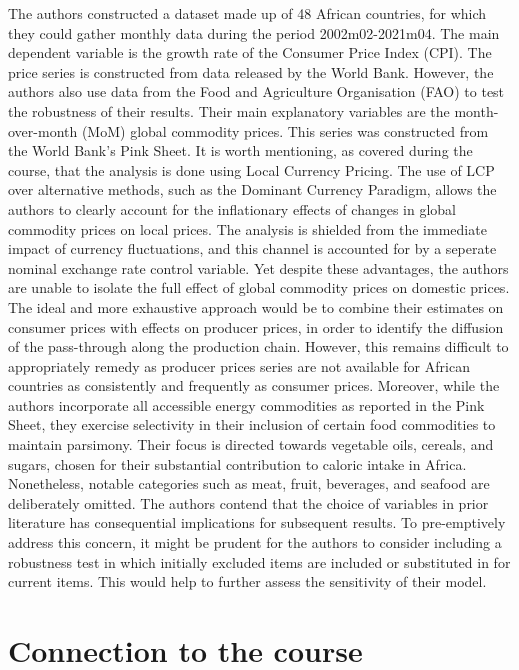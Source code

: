 \documentclass[11pt]{article}
\newcommand{\bb}{\bigbreak\noindent}
\begin{document}
\begin{spacing}{2}
		The authors constructed a dataset made up of 48 African countries, for which they could gather monthly data during the period 2002m02-2021m04. The main dependent variable is the growth rate of the Consumer Price Index (CPI). The price series is constructed from data released by the World Bank. However, the authors also use data from the Food and Agriculture Organisation (FAO) to test the robustness of their results. Their main explanatory variables are the month-over-month (MoM) global commodity prices. This series was constructed from the World Bank's Pink Sheet. 
		\bb
		It is worth mentioning, as covered during the course, that the analysis is done using Local Currency Pricing. 
		The use of LCP over alternative methods, such as the Dominant Currency Paradigm, allows the authors to clearly account for the inflationary effects of changes in global commodity prices on local prices. The analysis is shielded from the immediate impact of currency fluctuations, and this channel is accounted for by a seperate nominal exchange rate control variable. Yet despite these advantages, the authors are unable to isolate the full effect of global commodity prices on domestic prices. The ideal and more exhaustive approach would be to combine their estimates on consumer prices with effects on producer prices, in order to identify the diffusion of the pass-through along the production chain. However, this remains difficult to appropriately remedy as producer prices series are not available for African countries as consistently and frequently as consumer prices.
		\bb
		Moreover, while the authors incorporate all accessible energy commodities as reported in the Pink Sheet, they exercise selectivity in their inclusion of certain food commodities to maintain parsimony. Their focus is directed towards vegetable oils, cereals, and sugars, chosen for their substantial contribution to caloric intake in Africa. Nonetheless, notable categories such as meat, fruit, beverages, and seafood are deliberately omitted. The authors contend that the choice of variables in prior literature has consequential implications for subsequent results.  To pre-emptively address this concern, it might be prudent for the authors to consider including a robustness test in which initially excluded items are included or substituted in for current items. This would help to further assess the sensitivity of their model.
		
		
		
		\section{Connection to the course}


\end{spacing}
\end{document}
